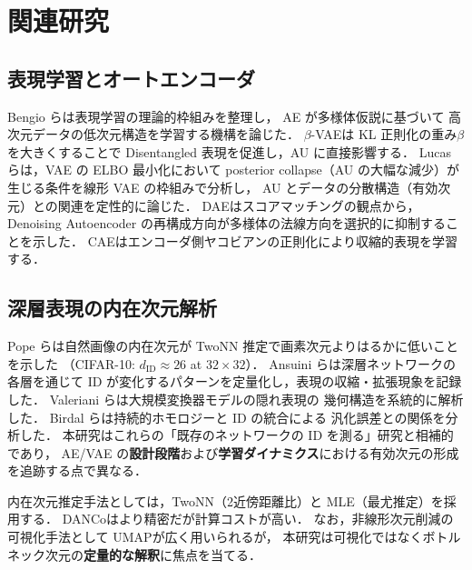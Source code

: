 \documentclass[11pt,a4paper]{jsarticle}
\begin{document}
\section{関連研究}\label{sec:related}

\subsection{表現学習とオートエンコーダ}\label{sec:related_ae}

Bengio ら\cite{bengio2013representation}は表現学習の理論的枠組みを整理し，
AE が多様体仮説\cite{fefferman2016manifold}に基づいて
高次元データの低次元構造を学習する機構を論じた．
$\beta$-VAE\cite{higgins2017betavae}は KL 正則化の重み$\beta$を大きくすることで
Disentangled 表現を促進し，AU に直接影響する．
Lucas ら\cite{lucas2019elbo}は，VAE の ELBO 最小化において
posterior collapse（AU の大幅な減少）が生じる条件を線形 VAE の枠組みで分析し，
AU とデータの分散構造（有効次元）との関連を定性的に論じた．
DAE\cite{alain2014dae}はスコアマッチングの観点から，
Denoising Autoencoder の再構成方向が多様体の法線方向を選択的に抑制することを示した．
CAE\cite{rifai2011cae}はエンコーダ側ヤコビアンの正則化により収縮的表現を学習する．

\subsection{深層表現の内在次元解析}\label{sec:related_id}

Pope ら\cite{pope2021intrinsic}は自然画像の内在次元が
TwoNN 推定で画素次元よりはるかに低いことを示した
（CIFAR-10: $d_\mathrm{ID} \approx 26$ at $32 \times 32$）．
Ansuini ら\cite{ansuini2019intrinsic}は深層ネットワークの各層を通じて
ID が変化するパターンを定量化し，表現の収縮・拡張現象を記録した．
Valeriani ら\cite{valeriani2023geometry}は大規模変換器モデルの隠れ表現の
幾何構造を系統的に解析した．
Birdal ら\cite{birdal2021intrinsic}は持続的ホモロジーと ID の統合による
汎化誤差との関係を分析した．
本研究はこれらの「既存のネットワークの ID を測る」研究と相補的であり，
AE/VAE の\textbf{設計段階}および\textbf{学習ダイナミクス}における有効次元の形成を追跡する点で異なる．

内在次元推定手法としては，TwoNN\cite{facco2017twonn}（2近傍距離比）と
MLE\cite{levina2005mle}（最尤推定）を採用する．
DANCo\cite{ceruti2014danco}はより精密だが計算コストが高い．
なお，非線形次元削減の可視化手法として UMAP\cite{mcinnes2018umap}が広く用いられるが，
本研究は可視化ではなくボトルネック次元の\textbf{定量的な解釈}に焦点を当てる．
\end{document}
